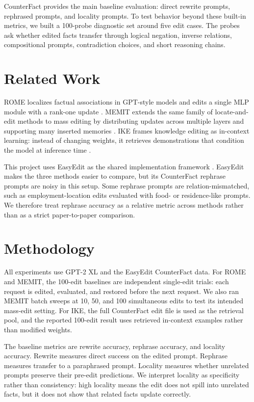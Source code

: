 \documentclass[11pt]{article}
\begin{document}
CounterFact provides the main baseline evaluation: direct rewrite prompts, rephrased prompts, and locality prompts. To test behavior beyond these built-in metrics, we built a 100-probe diagnostic set around five edit cases. The probes ask whether edited facts transfer through logical negation, inverse relations, compositional prompts, contradiction choices, and short reasoning chains.

\section{Related Work}

ROME localizes factual associations in GPT-style models and edits a single MLP module with a rank-one update \citep{meng2022rome}. MEMIT extends the same family of locate-and-edit methods to mass editing by distributing updates across multiple layers and supporting many inserted memories \citep{meng2023memit}. IKE frames knowledge editing as in-context learning: instead of changing weights, it retrieves demonstrations that condition the model at inference time \citep{zheng2023ike}.

This project uses EasyEdit as the shared implementation framework \citep{wang2024easyedit}. EasyEdit makes the three methods easier to compare, but its CounterFact rephrase prompts are noisy in this setup. Some rephrase prompts are relation-mismatched, such as employment-location edits evaluated with food- or residence-like prompts. We therefore treat rephrase accuracy as a relative metric across methods rather than as a strict paper-to-paper comparison.

\section{Methodology}

All experiments use GPT-2 XL and the EasyEdit CounterFact data. For ROME and MEMIT, the 100-edit baselines are independent single-edit trials: each request is edited, evaluated, and restored before the next request. We also ran MEMIT batch sweeps at 10, 50, and 100 simultaneous edits to test its intended mass-edit setting. For IKE, the full CounterFact edit file is used as the retrieval pool, and the reported 100-edit result uses retrieved in-context examples rather than modified weights.

The baseline metrics are rewrite accuracy, rephrase accuracy, and locality accuracy. Rewrite measures direct success on the edited prompt. Rephrase measures transfer to a paraphrased prompt. Locality measures whether unrelated prompts preserve their pre-edit predictions. We interpret locality as specificity rather than consistency: high locality means the edit does not spill into unrelated facts, but it does not show that related facts update correctly.
\end{document}
